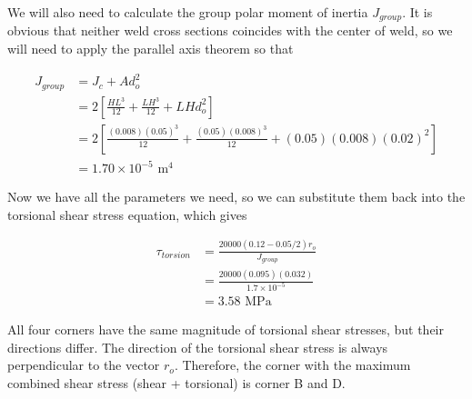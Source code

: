 \documentclass[
10pt,
a4paper,
openany,
svgnames,
]{book}
\begin{document}
\begin{solution}
   We will also need to calculate the group polar moment of inertia $J_{group}$. It is obvious that neither weld cross sections coincides with the center of weld, so we will need to apply the parallel axis theorem so that

   \begin{align*}
     J_{group} &= J_c + A d_o^2 \\
               &= 2 \left[ \frac{HL^3}{12} +\frac{LH^3}{12} + LHd_o^2 \right] \\
               &= 2 \left[ \frac{(0.008)(0.05)^3}{12} + \frac{(0.05)(0.008)^3}{12} + (0.05)(0.008)(0.02)^2 \right] \\
               &= 1.70 \times 10^{-5} \text{ m}^4
   \end{align*}

   Now we have all the parameters we need, so we can substitute them back into the torsional shear stress equation, which gives

   \begin{align*}
     \tau_{torsion} &= \frac{20000(0.12-0.05/2) r_o}{J_{group}} \\
                    &= \frac{20000(0.095)(0.032)}{1.7 \times 10^{-5}} \\
                    &= 3.58 \text{ MPa}
   \end{align*}

   All four corners have the same magnitude of torsional shear stresses, but their directions differ. The direction of the torsional shear stress is always perpendicular to the vector $r_o$. Therefore, the corner with the maximum combined shear stress (shear + torsional) is corner B and D.

 \begin{figure}[H]
    \centering
  \end{figure}


\end{solution}
\end{document}

